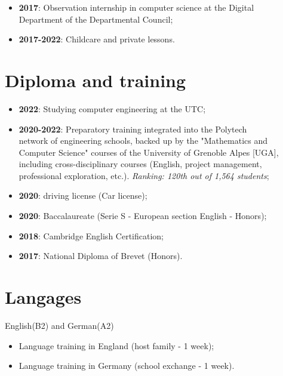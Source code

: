 \documentclass[10pt, oneside, a4paper, titlepage]{article}
\begin{document}
\begin{tcolorbox}
\begin{minipage}[t]{12cm}
\begin{tcolorbox}[grow to right by = 0.6cm, colback = gray!25, colframe = white]
\begin{itemize}
                    \item \textbf{2017}: Observation internship in computer science at the Digital \\Department of the Departmental Council;
                    
                    \item \textbf{2017-2022}: Childcare and private lessons.
                \end{itemize}

                \section*{Diploma and training}
                \begin{itemize}
                    \item \textbf{2022}: Studying computer engineering at the UTC;
                    \item \textbf{2020-2022}: Preparatory training integrated into the Polytech 
                    \\ network of engineering schools, backed up by the "Mathematics 
                    and Computer Science" courses of the University of Grenoble Alpes [UGA], 
                    including cross-disciplinary courses 
                    (English, project management, professional exploration, etc.). \emph{Ranking: 120th out of 1,564 students};
                    \item \textbf{2020}: driving license (Car license);
                    \item \textbf{2020}: Baccalaureate (Serie S - European section English - Honors); 
                    \item \textbf{2018}: Cambridge English Certification;
                    \item \textbf{2017}: National Diploma of Brevet (Honors).
                \end{itemize}

                \section*{Langages}
                    English(B2) and German(A2) 
                    \begin{itemize}
                        \item Language training in England (host family - 1 week);
                        \item Language training in Germany (school exchange - 1 week).
                    \end{itemize}

                
            \end{tcolorbox}
        \end{minipage}
    \end{tcolorbox}
\end{document}
